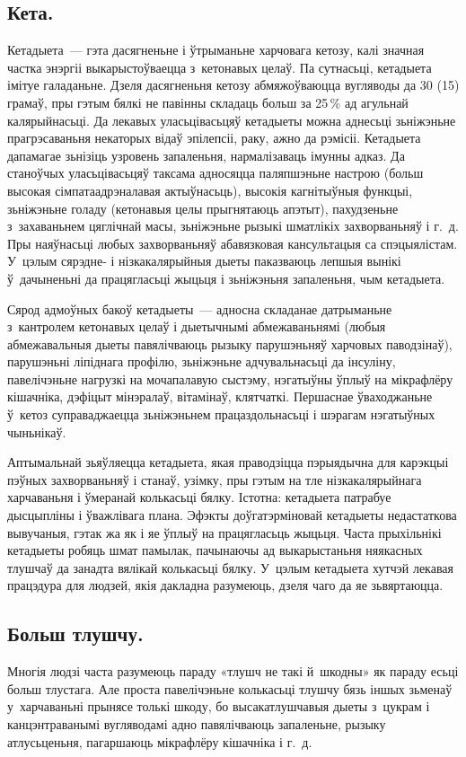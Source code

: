 \subsection{Кета.}
Кетадыета~--- гэта дасягненьне і ўтрыманьне харчовага кетозу, калі значная частка энэргіі выкарыстоўваецца з~кетонавых целаў. Па сутнасьці, кетадыета імітуе галаданьне. Дзеля дасягненьня кетозу абмяжоўваюцца вугляводы да 30 (15) грамаў, пры гэтым бялкі не павінны складаць больш за 25\,\% ад агульнай калярыйнасьці. Да лекавых уласьцівасьцяў кетадыеты можна аднесьці зьніжэньне прагрэсаваньня некаторых відаў эпілепсіі, раку, ажно да рэмісіі. Кетадыета дапамагае зьнізіць узровень запаленьня, нармалізаваць імунны адказ. Да станоўчых уласьцівасьцяў таксама адносяцца паляпшэньне настрою (больш высокая сімпатаадрэналавая актыўнасьць), высокія кагнітыўныя функцыі, зьніжэньне голаду (кетонавыя целы прыгнятаюць апэтыт), пахудзеньне з~захаваньнем цяглічнай масы, зьніжэньне рызыкі шматлікіх захворваньняў і г.~д. Пры наяўнасьці любых захворваньняў абавязковая кансультацыя са спэцыялістам. У~цэлым сярэдне- і нізкакалярыйныя дыеты паказваюць лепшыя вынікі ў~дачыненьні да працягласьці жыцьця і зьніжэньня запаленьня, чым кетадыета.


Сярод адмоўных бакоў кетадыеты~--- адносна складанае датрыманьне з~кантролем кетонавых целаў і дыетычнымі абмежаваньнямі (любыя абмежавальныя дыеты павялічваюць рызыку парушэньняў харчовых паводзінаў), парушэньні ліпіднага профілю, зьніжэньне адчувальнасьці да інсуліну, павелічэньне нагрузкі на мочапалавую сыстэму, нэгатыўны ўплыў на мікрафлёру кішачніка, дэфіцыт мінэралаў, вітамінаў, клятчаткі. Першаснае ўваходжаньне ў~кетоз суправаджаецца зьніжэньнем працаздольнасьці і шэрагам нэгатыўных чыньнікаў.

Аптымальнай зьяўляецца кетадыета, якая праводзіцца пэрыядычна для карэкцыі пэўных захворваньняў і станаў, узімку, пры гэтым на тле нізкакалярыйнага харчаваньня і ўмеранай колькасьці бялку. Істотна: кетадыета патрабуе дысцыпліны і ўважлівага плана. Эфэкты доўгатэрміновай кетадыеты недастаткова вывучаныя, гэтак жа як і яе ўплыў на працягласьць жыцьця. Часта прыхільнікі кетадыеты робяць шмат памылак, пачынаючы ад выкарыстаньня няякасных тлушчаў да занадта вялікай колькасьці бялку. У~цэлым кетадыета хутчэй лекавая працэдура для людзей, якія дакладна разумеюць, дзеля чаго да яе зьвяртаюцца.

\subsection{Больш тлушчу.}
Многія людзі часта разумеюць параду «тлушч не такі й~шкодны» як параду есьці больш тлустага. Але проста павелічэньне колькасьці тлушчу бязь іншых зьменаў у~харчаваньні прынясе толькі шкоду, бо высакатлушчавыя дыеты з~цукрам і канцэнтраванымі вугляводамі адно павялічваюць запаленьне, рызыку атлусьценьня, пагаршаюць мікрафлёру кішачніка і г.~д.
